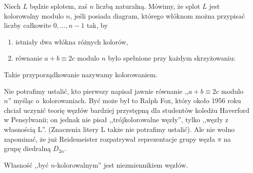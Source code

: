 \begin{definition}[kolorowanie]
%
\label{def:colouring_equation}%
    Niech $L$ będzie splotem, zaś $n$ liczbą naturalną.
    Mówimy, że splot $L$ jest kolorowalny modulo $n$, jeśli posiada diagram, którego włóknom można przypisać liczby całkowite $0, \ldots, n - 1$ tak, by
    \begin{enumerate}
        \item istniały dwa włókna różnych kolorów,
        \item równanie $a + b \equiv 2c$ modulo $n$ było spełnione przy każdym skrzyżowaniu:
    \end{enumerate}

    Takie przyporządkowanie nazywamy kolorowaniem.
\end{definition}

Nie potrafimy ustalić, kto pierwszy napisał jawnie równanie ,,$a + b \equiv 2c$ modulo $n$'' myśląc o~kolorowaniach.
Być może był to Ralph Fox, który około 1956 roku chciał uczynić teorię węzłów bardziej przystępną dla studentów koledżu Haverford w Pensylwanii; on jednak nie pisał ,,trójkolorowalne węzły'', tylko ,,węzły z własnością L''.
(Znaczenia litery L także nie potrafimy ustalić).
Ale nie wolno zapominać, że już Reidemeister rozpatrywał reprezentacje grupy węzła $\pi$ na grupę diedralną $D_{2n}$.

\begin{proposition}
\label{prp:colouring_invariance}%
    Własność ,,być $n$-kolorowalnym'' jest niezmiennikiem węzłów.
\end{proposition}

